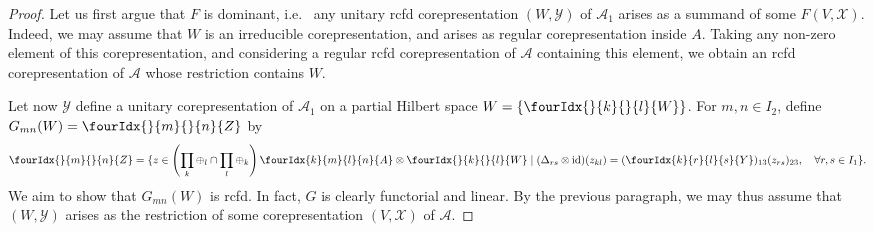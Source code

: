 \documentclass[10pt]{article}
\DeclareMathOperator{\id}{id}
\newcommand{\Gr}[5]{\fourIdx{#2}{#4}{#3}{#5}{#1}}%
\newcommand{\Gru}[3]{\Gr{#1}{}{}{#2}{#3}}
\theoremstyle{definition}
\numberwithin{equation}{section}
\begin{document}
\begin{proof}
Let us first argue that $F$ is dominant, i.e.~ any unitary rcfd corepresentation $(W,\mathscr{Y})$ of $\mathscr{A}_1$ arises as a summand of some $F(V,\mathscr{X})$. Indeed, we may assume that $W$ is an irreducible corepresentation, and arises as regular corepresentation inside $A$. Taking any non-zero element of this corepresentation, and considering a regular rcfd corepresentation of $\mathscr{A}$ containing this element, we obtain an rcfd corepresentation of $\mathscr{A}$ whose restriction contains $W$.

Let now $\mathscr{Y}$ define a unitary corepresentation of $\mathscr{A}_1$ on a partial Hilbert space $W= \{\Gru{W}{k}{l}\}$. For $m,n\in I_{2}$, define $G_{mn}(W) = \Gru{Z}{m}{n}$ by \[ \Gru{Z}{m}{n} = \{z \in \left(\prod_k\oplus_l\cap \prod_l\oplus_k\right) \Gr{A}{k}{l}{m}{n}\otimes \Gru{W}{k}{l}\mid (\Delta_{rs}\otimes \id)(z_{kl}) = (\Gr{Y}{k}{l}{r}{s})_{13}(z_{rs})_{23},\quad \forall r,s\in I_1\}.\] We aim to show that $G_{mn}(W)$ is rcfd. In fact, $G$ is clearly functorial and linear. By the previous paragraph, we may thus assume that $(W,\mathscr{Y})$ arises as the restriction of some corepresentation $(V,\mathscr{X})$ of $\mathscr{A}$. 


\end{proof}
\end{document}
